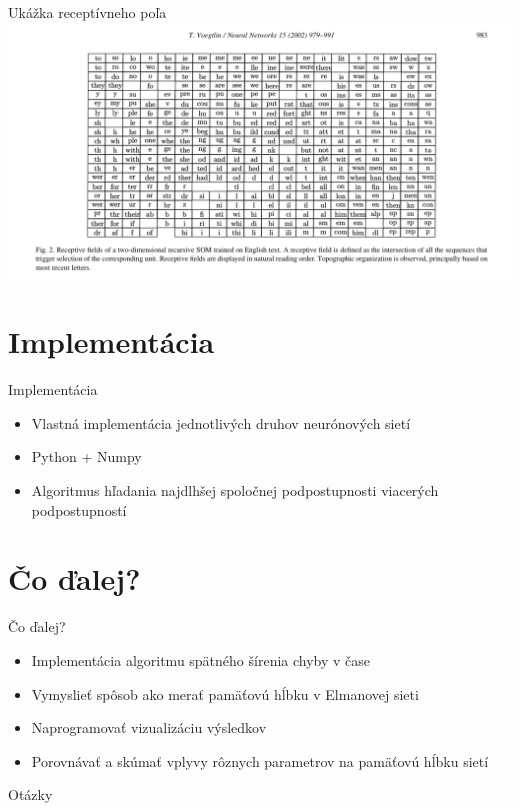 \documentclass[10pt]{beamer}
\begin{document}
\begin{frame}[fragile]{Ukážka receptívneho poľa}
\includegraphics[width=\textwidth]{receptive_field}
\end{frame}

\section{Implementácia}
\begin{frame}{Implementácia}

\begin{itemize}
  \item Vlastná implementácia jednotlivých druhov neurónových sietí
  \item Python + Numpy
  \item Algoritmus hľadania najdlhšej spoločnej podpostupnosti viacerých podpostupností
\end{itemize}
\end{frame}


\section{Čo ďalej?}
\begin{frame}{Čo ďalej?}
  \begin{itemize}
    \item Implementácia algoritmu spätného šírenia chyby v čase
    \item Vymyslieť spôsob ako merať pamäťovú hĺbku v Elmanovej sieti
    \item Naprogramovať vizualizáciu výsledkov
    \item Porovnávať a skúmať vplyvy rôznych parametrov na pamäťovú hĺbku sietí
  \end{itemize}
  \end{frame}


{
\begin{frame}[standout]
  Otázky
\end{frame}
}
\end{document}
